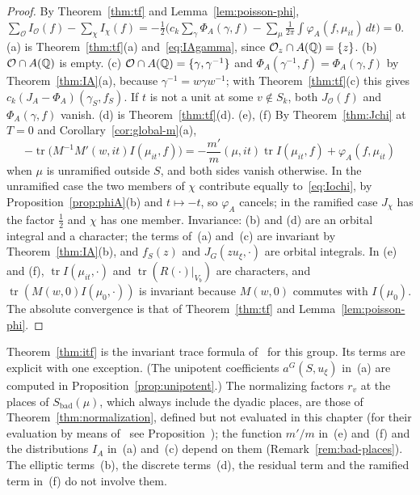 \begin{proof}
By Theorem~\ref{thm:tf} and Lemma~\ref{lem:poisson-phi}, $\sum_{\mathcal
O}I_{\mathcal O}(f)-\sum_\chi I_\chi(f)=-\frac12\bigl(c_k\sum_\gamma
\Phi_A(\gamma,f)-\sum_\mu\frac1{2\pi}\int\varphi_A(f,\mu_{it})\,dt\bigr)=0$.
(a) is Theorem~\ref{thm:tf}(a) and~\eqref{eq:IAgamma}, since $\mathcal O_z
\cap A(\mathbb{Q})=\{z\}$. (b) $\mathcal O\cap A(\mathbb{Q})$ is empty. (c) $\mathcal
O\cap A(\mathbb{Q})=\{\gamma,\gamma^{-1}\}$ and $\Phi_A(\gamma^{-1},f)=\Phi_A(\gamma,
f)$ by Theorem~\ref{thm:IA}(a), because $\gamma^{-1}=w\gamma w^{-1}$; with
Theorem~\ref{thm:tf}(c) this gives $c_k(J_A-\Phi_A)(\gamma_S,f_S)$. If $t$
is not a unit at some $v\notin S_k$, both $J_{\mathcal O}(f)$ and
$\Phi_A(\gamma,f)$ vanish. (d) is Theorem~\ref{thm:tf}(d). (e), (f) By
Theorem~\ref{thm:Jchi} at $T=0$ and Corollary~\ref{cor:global-m}(a),
\[
-\operatorname{tr}\bigl(M^{-1}M'(w,it)I(\mu_{it},f)\bigr)=-\frac{m'}m(\mu,
it)\operatorname{tr}I(\mu_{it},f)+\varphi_A(f,\mu_{it})
\]
when $\mu$ is unramified outside $S$, and both sides vanish otherwise. In
the unramified case the two members of $\chi$ contribute equally
to~\eqref{eq:Iochi}, by Proposition~\ref{prop:phiA}(b) and $t\mapsto-t$,
so $\varphi_A$ cancels; in the ramified case $J_\chi$ has the factor
$\frac12$ and $\chi$ has one member. Invariance: (b) and (d) are an
orbital integral and a character; the terms of~(a) and~(c) are invariant
by Theorem~\ref{thm:IA}(b), and $f_S(z)$ and $J_G(zu_\xi,\cdot)$ are
orbital integrals. In (e) and (f), $\operatorname{tr}I(\mu_{it},\cdot)$
and $\operatorname{tr}(R(\cdot)|_{V_b})$ are characters, and
$\operatorname{tr}(M(w,0)I(\mu_0,\cdot))$ is invariant because $M(w,0)$
commutes with $I(\mu_0)$. The absolute convergence is that of
Theorem~\ref{thm:tf} and Lemma~\ref{lem:poisson-phi}.
\end{proof}

Theorem~\ref{thm:itf} is the invariant trace formula of~\cite{Li14b} for
this group. Its terms are explicit with one exception. (The unipotent
coefficients $a^G(S,u_\xi)$ in~(a) are computed in
Proposition~\ref{prop:unipotent}.) The normalizing factors $r_v$ at the
places of $S_{\mathrm{bad}}(\mu)$, which always include the dyadic places,
are those of Theorem~\ref{thm:normalization}, defined but not evaluated
in this chapter (for their evaluation by means of~\cite{Sz09,Sz16} see
Proposition~\normref{}); the function $m'/m$ in~(e) and~(f) and the distributions $I_A$
in~(a) and~(c) depend on them (Remark~\ref{rem:bad-places}). The elliptic
terms~(b), the discrete terms~(d), the residual term and the ramified term
in~(f) do not involve them.

